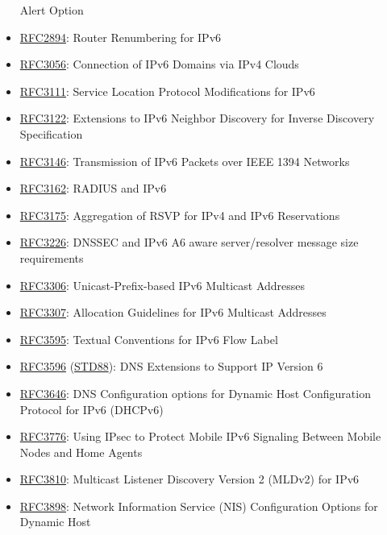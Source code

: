 \documentclass[
]{article}
\begin{document}
\begin{itemize}
  Alert Option
\item
  \href{https://www.rfc-editor.org/info/rfc2894}{RFC2894}: Router
  Renumbering for IPv6
\item
  \href{https://www.rfc-editor.org/info/rfc3056}{RFC3056}: Connection of
  IPv6 Domains via IPv4 Clouds
\item
  \href{https://www.rfc-editor.org/info/rfc3111}{RFC3111}: Service
  Location Protocol Modifications for IPv6
\item
  \href{https://www.rfc-editor.org/info/rfc3122}{RFC3122}: Extensions to
  IPv6 Neighbor Discovery for Inverse Discovery Specification
\item
  \href{https://www.rfc-editor.org/info/rfc3146}{RFC3146}: Transmission
  of IPv6 Packets over IEEE 1394 Networks
\item
  \href{https://www.rfc-editor.org/info/rfc3162}{RFC3162}: RADIUS and
  IPv6
\item
  \href{https://www.rfc-editor.org/info/rfc3175}{RFC3175}: Aggregation
  of RSVP for IPv4 and IPv6 Reservations
\item
  \href{https://www.rfc-editor.org/info/rfc3226}{RFC3226}: DNSSEC and
  IPv6 A6 aware server/resolver message size requirements
\item
  \href{https://www.rfc-editor.org/info/rfc3306}{RFC3306}:
  Unicast-Prefix-based IPv6 Multicast Addresses
\item
  \href{https://www.rfc-editor.org/info/rfc3307}{RFC3307}: Allocation
  Guidelines for IPv6 Multicast Addresses
\item
  \href{https://www.rfc-editor.org/info/rfc3595}{RFC3595}: Textual
  Conventions for IPv6 Flow Label
\item
  \href{https://www.rfc-editor.org/info/rfc3596}{RFC3596}
  (\href{https://www.rfc-editor.org/info/std88}{STD88}): DNS Extensions
  to Support IP Version 6
\item
  \href{https://www.rfc-editor.org/info/rfc3646}{RFC3646}: DNS
  Configuration options for Dynamic Host Configuration Protocol for IPv6
  (DHCPv6)
\item
  \href{https://www.rfc-editor.org/info/rfc3776}{RFC3776}: Using IPsec
  to Protect Mobile IPv6 Signaling Between Mobile Nodes and Home Agents
\item
  \href{https://www.rfc-editor.org/info/rfc3810}{RFC3810}: Multicast
  Listener Discovery Version 2 (MLDv2) for IPv6
\item
  \href{https://www.rfc-editor.org/info/rfc3898}{RFC3898}: Network
  Information Service (NIS) Configuration Options for Dynamic Host

\end{itemize}
\end{document}
